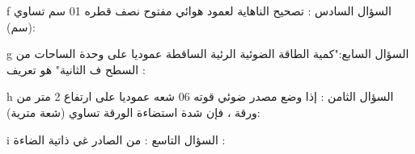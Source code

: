 \documentclass[a4paper]{article}
\begin{document}
\begin{examcopy}
\begin{multicols}{3}
  \begin{arab}\begin{question}{f}
السؤال السادس : تصحيح الناهاية لعمود هوائي مفتوح نصف قطره 01 سم تساوي (سم):
    \columnseprule=0pt\begin{multicols}{2}
    \begin{choices}[o]
    \end{choices}
    \end{multicols}
  \end{question}\end{arab}
  
 \begin{arab}\begin{question}{g}
السؤال السابع:"كمية الطاقة الضوئية الرئية الساقطة عموديا على وحدة الساحات من السطح ف الثانية" هو تعريف :‬
    \begin{choices}
    \end{choices}
  \end{question}\end{arab}
  


  \begin{arab}\begin{question}{h}
السؤال الثامن : إذا وضع مصدر ضوئي قوته 06 شعه عموديا على ارتفاع 2 متر من ورقة ، فإن شدة استضاءة الورقة تساوي (شعة مترية):
    \columnseprule=0pt\begin{multicols}{2}
    \begin{choices}[o]
    \end{choices}
    \end{multicols}
  \end{question}\end{arab}
  

   \begin{arab}\begin{question}{i}
السؤال التاسع : من الصادر غي ذاتية الضاءة :
    \columnseprule=0pt\begin{multicols}{2}
    \begin{choices}
    \end{choices}
    \end{multicols}
  \end{question}\end{arab}


\end{multicols}  

\end{examcopy}
\end{document}
